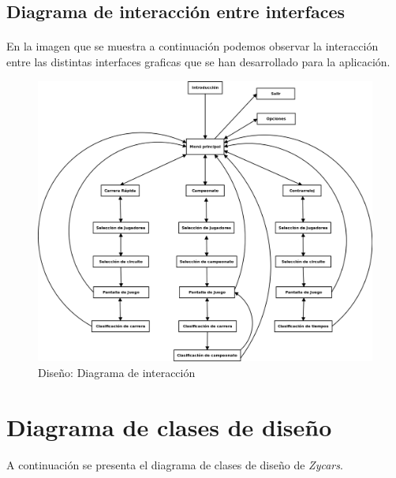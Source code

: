 \subsection{Diagrama de interacción entre interfaces}

\paragraph{}
En la imagen que se muestra a continuación podemos observar la interacción entre las distintas interfaces graficas que se han 
desarrollado para la aplicación.

\begin{figure}[H]
  \label{diagrama_interaccion}
  \begin{center}
    \includegraphics[scale=0.4]{imagenes/diseno/diagrama_interaccion.png}
  \end{center}
  \caption{Diseño: Diagrama de interacción}
\end{figure}

\section{Diagrama de clases de diseño}

A continuación se presenta el diagrama de clases de diseño de \emph{Zycars}.

\newpage

